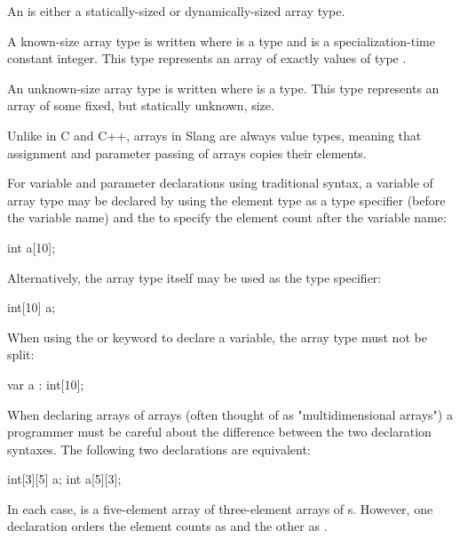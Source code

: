 
An  is either a statically-sized or dynamically-sized array type.

A known-size array type is written  where  is a type and  is a specialization-time constant integer.
This type represents an array of exactly  values of type .

An unknown-size array type is written  where  is a type.
This type represents an array of some fixed, but statically unknown, size.

\begin{Note}
Unlike in C and C++, arrays in Slang are always value types, meaning that assignment and parameter passing of arrays copies their elements.
\end{Note}


For variable and parameter declarations using traditional syntax, a variable of array type may be declared by using the element type  as a type specifier (before the variable name) and the \Char{[N]} to specify the element count after the variable name:

\begin{codeblock}
int a[10];
\end{codeblock}

Alternatively, the array type itself may be used as the type specifier:

\begin{codeblock}
int[10] a;
\end{codeblock}

When using the  or  keyword to declare a variable, the array type must not be split:

\begin{codeblock}
var a : int[10];
\end{codeblock}

\begin{Note}
When declaring arrays of arrays (often thought of as "multidimensional arrays") a programmer must be careful about the difference between the two declaration syntaxes.
The following two declarations are equivalent:
\begin{codeblock}
int[3][5] a;
int a[5][3];
\end{codeblock}
In each case,  is a five-element array of three-element arrays of s.
However, one declaration orders the element counts as \Char{[3][5]} and the other as \Char{[5][3]}.
\end{Note}

